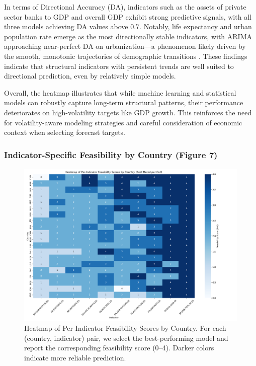 \documentclass[12pt]{article}
\begin{document}
In terms of Directional Accuracy (DA), indicators such as the assets of private sector banks to GDP and overall GDP exhibit strong predictive signals, with all three models achieving DA values above 0.7. Notably, life expectancy and urban population rate emerge as the most directionally stable indicators, with ARIMA approaching near-perfect DA on urbanization—a phenomenon likely driven by the smooth, monotonic trajectories of demographic transitions \cite{Bloom2008, Montgomery2003}. These findings indicate that structural indicators with persistent trends are well suited to directional prediction, even by relatively simple models.

Overall, the heatmap illustrates that while machine learning and statistical models can robustly capture long-term structural patterns, their performance deteriorates on high-volatility targets like GDP growth. This reinforces the need for volatility-aware modeling strategies and careful consideration of economic context when selecting forecast targets.

\subsubsection*{Indicator-Specific Feasibility by Country (Figure 7)}


\begin{figure}[h]
    \centering
    \includegraphics[width=\textwidth]{figure8.png}
    \caption{Heatmap of Per-Indicator Feasibility Scores by Country. For each (country, indicator) pair, we select the best-performing model and report the corresponding feasibility score (0–4). Darker colors indicate more reliable prediction.}
    \label{fig:heatmap_feasibility}
\end{figure}
\end{document}
